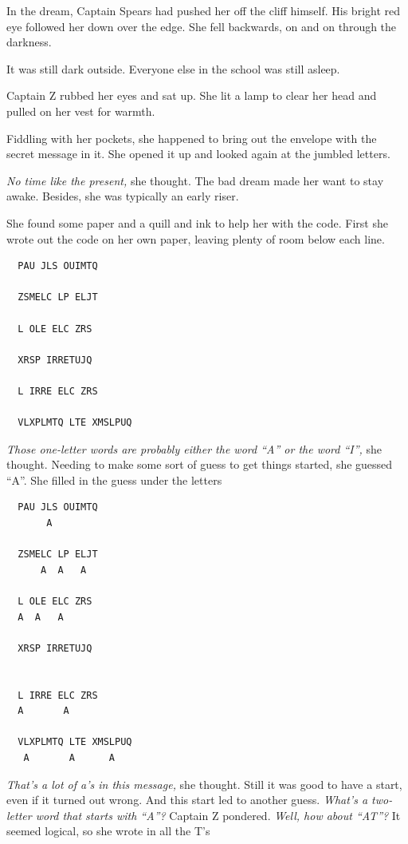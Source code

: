\documentclass[12pt]{extbook}
\begin{document}
  In the dream, Captain Spears had pushed her off the cliff himself. His
  bright red eye followed her down over the edge. She fell backwards, on
  and on through the darkness.
  
  It was still dark outside. Everyone else in the school was still asleep.
  
  Captain Z rubbed her eyes and sat up. She lit a lamp to clear her head
  and pulled on her vest for warmth.
  
  Fiddling with her pockets, she happened to bring out the envelope with
  the secret message in it. She opened it up and looked again at the
  jumbled letters.
  
  \emph{No time like the present,} she thought. The bad dream made her
  want to stay awake. Besides, she was typically an early riser.
  
  She found some paper and a quill and ink to help her with the code.
  First she wrote out the code on her own paper, leaving plenty of room
  below each line.
  
  \begin{lstlisting}
  PAU JLS OUIMTQ
  
  ZSMELC LP ELJT
  
  L OLE ELC ZRS
  
  XRSP IRRETUJQ
  
  L IRRE ELC ZRS
  
  VLXPLMTQ LTE XMSLPUQ
  \end{lstlisting}
  
  \emph{Those one-letter words are probably either the word \enquote{A} or
  the word \enquote{I},} she thought. Needing to make some sort of guess
  to get things started, she guessed \enquote{A}. She filled in the guess
  under the letters
  
  \begin{lstlisting}
  PAU JLS OUIMTQ
       A
  
  ZSMELC LP ELJT
      A  A   A
  
  L OLE ELC ZRS
  A  A   A
  
  XRSP IRRETUJQ
  
  
  L IRRE ELC ZRS
  A       A
  
  VLXPLMTQ LTE XMSLPUQ
   A       A      A
  \end{lstlisting}
  
  \emph{That's a lot of a's in this message,} she thought. Still it was
  good to have a start, even if it turned out wrong. And this start led to
  another guess. \emph{What's a two-letter word that starts with
  \enquote{A}?} Captain Z pondered. \emph{Well, how about \enquote{AT}?}
  It seemed logical, so she wrote in all the T's
  
\end{document}
